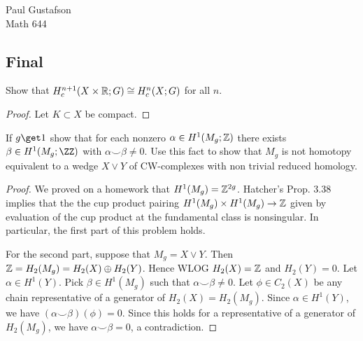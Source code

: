 \documentclass{article}
\begin{document}
\noindent Paul Gustafson\\
\noindent Math 644

\subsection*{Final}
 Show that $H_c^{n+1}(X \times \mathbb{R}; G) \cong H_c^n(X; G)$ for all $n$.
\begin{proof}
Let $K \subset X$ be compact.
\end{proof}

 If $g \get 1$ show that for each nonzero $\alpha \in H^1(M_g; \mathbb{Z})$ there exists $\beta \in H^1(M_g;\ZZ)$ with
$\alpha \smile \beta \neq 0$. Use this fact to show that $M_g$ is not homotopy equivalent to a wedge $X \vee Y$ of 
CW-complexes with non trivial reduced homology.

\begin{proof}
We proved on a homework that $H^1(M_g) = \mathbb{Z}^{2g}$. Hatcher's Prop. 3.38 implies that the the cup product pairing
$H^1(M_g) \times H^1(M_g) \to \mathbb{Z}$ given by evaluation of the cup product at the fundamental class is nonsingular. 
In particular, the first part of this problem holds.

For the second part, suppose that $M_g = X \vee Y$. Then $\mathbb{Z} = H_2(M_g) = H_2(X) \oplus H_2(Y)$.  Hence WLOG $H_2(X) = \mathbb{Z}$ and $H_2(Y) = 0$. 
Let $\alpha \in H^1(Y)$. Pick $\beta \in H^1(M_g)$ such that $\alpha \smile \beta \neq 0$.
Let $\phi \in C_2(X)$ be any chain representative of a generator of $H_2(X) = H_2(M_g)$.  Since $\alpha \in H^1(Y)$, we have
$(\alpha \smile \beta)(\phi) = 0$.  Since this holds for a representative of a generator of $H_2(M_g)$, we have $\alpha \smile \beta = 0$, a contradiction.
\end{proof}
\end{document}
